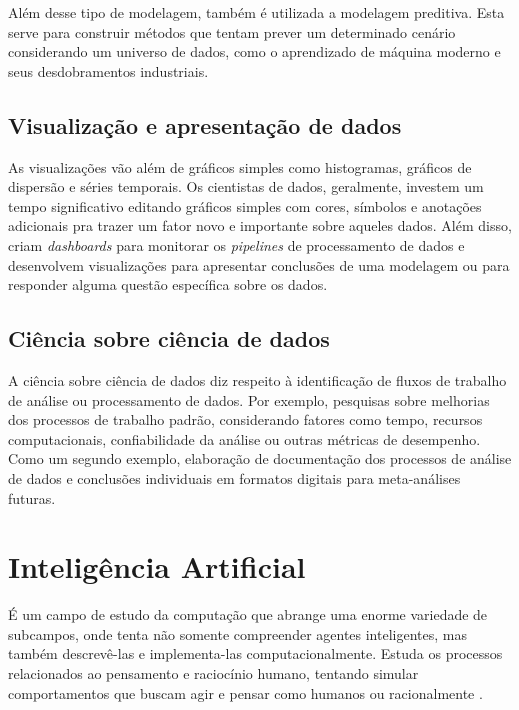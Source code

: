 Além desse tipo de modelagem, também é utilizada a modelagem preditiva. Esta serve para construir métodos que tentam prever um determinado cenário considerando um universo de dados, como o aprendizado de máquina moderno e seus desdobramentos industriais.
     
\subsection*{Visualização e apresentação de dados}
As visualizações vão além de gráficos simples como histogramas, gráficos de dispersão e séries temporais. 
Os cientistas de dados, geralmente, investem um tempo significativo editando gráficos simples com cores, símbolos e anotações adicionais pra trazer um fator novo e importante sobre aqueles dados. 
Além disso, criam \textit{dashboards} para monitorar os \textit{pipelines} de processamento de dados e desenvolvem visualizações para apresentar conclusões de uma modelagem ou para responder alguma questão específica sobre os dados.
     
\subsection*{Ciência sobre ciência de dados}
A ciência sobre ciência de dados diz respeito à identificação de fluxos de trabalho de análise ou processamento de dados. 
Por exemplo, pesquisas sobre melhorias dos processos de trabalho padrão, considerando fatores como tempo, recursos computacionais, confiabilidade da análise ou outras métricas de desempenho. 
Como um segundo exemplo, elaboração de documentação dos processos de análise de dados e conclusões individuais em formatos digitais para meta-análises futuras.

\section{Inteligência Artificial}
É um campo de estudo da computação que abrange uma enorme variedade de subcampos, onde tenta não somente compreender agentes inteligentes, mas também descrevê-las e implementa-las computacionalmente. Estuda os processos relacionados ao pensamento e raciocínio humano, tentando simular comportamentos que buscam agir e pensar como humanos ou racionalmente \cite{russell2004inteligencia}. 

